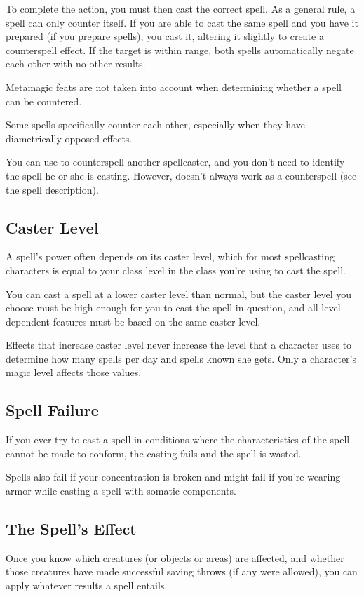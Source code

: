 To complete the action, you must then cast the correct spell. As a general rule, a spell can only counter itself. If you are able to cast the same spell and you have it prepared (if you prepare spells), you cast it, altering it slightly to create a counterspell effect. If the target is within range, both spells automatically negate each other with no other results.

 Metamagic feats are not taken into account when determining whether a spell can be countered.

 Some spells specifically counter each other, especially when they have diametrically opposed effects.

 You can use  to counterspell another spellcaster, and you don't need to identify the spell he or she is casting. However,  doesn't always work as a counterspell (see the spell description).

\subsection{Caster Level}
A spell's power often depends on its caster level, which for most spellcasting characters is equal to your class level in the class you're using to cast the spell.

You can cast a spell at a lower caster level than normal, but the caster level you choose must be high enough for you to cast the spell in question, and all level-dependent features must be based on the same caster level.

Effects that increase caster level never increase the level that a character uses to determine how many spells per day and spells known she gets. Only a character's magic level affects those values.

\subsection{Spell Failure}
If you ever try to cast a spell in conditions where the characteristics of the spell cannot be made to conform, the casting fails and the spell is wasted.

Spells also fail if your concentration is broken and might fail if you're wearing armor while casting a spell with somatic components.

\subsection{The Spell's Effect}
Once you know which creatures (or objects or areas) are affected, and whether those creatures have made successful saving throws (if any were allowed), you can apply whatever results a spell entails.

